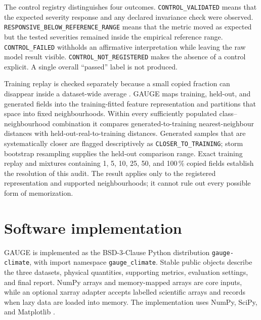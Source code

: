 \documentclass[gmd, manuscript]{copernicus}
\begin{document}
The control registry distinguishes four outcomes. \texttt{CONTROL\_VALIDATED} means
that the expected severity response and any declared invariance check were observed.
\texttt{RESPONSIVE\_BELOW\_REFERENCE\_RANGE} means that the metric moved as expected
but the tested severities remained inside the empirical reference range.
\texttt{CONTROL\_FAILED} withholds an affirmative interpretation while leaving the
raw model result visible. \texttt{CONTROL\_NOT\_REGISTERED} makes the absence of a
control explicit. A single overall ``passed'' label is not produced.

Training replay is checked separately because a small copied fraction can disappear
inside a dataset-wide average \citep{Somepalli2023,Carlini2023}. GAUGE maps training,
held-out, and generated fields into the training-fitted feature representation and
partitions that space into fixed neighbourhoods. Within every sufficiently populated
class--neighbourhood combination it compares generated-to-training nearest-neighbour
distances with held-out-real-to-training distances. Generated samples that are
systematically closer are flagged descriptively as
\texttt{CLOSER\_TO\_TRAINING}; storm bootstrap resampling supplies the held-out
comparison range. Exact training replay and mixtures containing 1, 5, 10, 25, 50,
and 100\,\% copied fields establish the resolution of this audit. The result applies
only to the registered representation and supported neighbourhoods; it cannot rule
out every possible form of memorization.

\section{Software implementation}
\label{sec:software}

GAUGE is implemented as the BSD-3-Clause Python distribution
\texttt{gauge-climate}, with import namespace
\texttt{gauge\_\allowbreak climate}. Stable public
objects describe the three datasets, physical quantities, supporting metrics,
evaluation settings, and final report. NumPy arrays and memory-mapped arrays are core
inputs, while an optional xarray adapter accepts labelled scientific arrays and records
when lazy data are loaded into memory. The implementation uses NumPy, SciPy, and
Matplotlib \citep{Harris2020NumPy,Virtanen2020SciPy,Hunter2007}.
\end{document}
